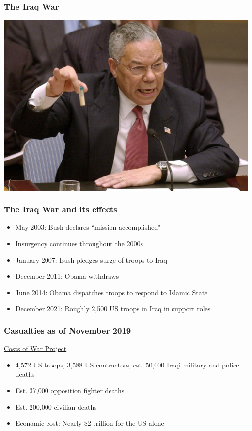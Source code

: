 \documentclass{beamer}
\begin{document}
\begin{frame} 
	\frametitle{\LARGE{The Iraq War}}
	\centering
	\includegraphics[width=\textwidth,height=0.8\textheight,keepaspectratio]{Powell.jpg}
\end{frame}


\begin{frame} 
	\frametitle{\LARGE{The Iraq War and its effects}}
	\begin{itemize}
		\item May 2003: Bush declares ``mission accomplished"
		\item Insurgency continues throughout the 2000s
		\item January 2007: Bush pledges surge of troops to Iraq
		\item December 2011: Obama withdraws
		\item June 2014: Obama dispatches troops to respond to Islamic State 
		\item December 2021: Roughly 2,500 US troops in Iraq in support roles
	\end{itemize}
\end{frame}

\begin{frame} 
	\frametitle{\LARGE{Casualties as of November 2019}}
	\href{https://watson.brown.edu/costsofwar/}{Costs of War Project}
	\begin{itemize}
		\item 4,572 US troops, 3,588 US contractors, est. 50,000 Iraqi military and police deaths
		\item Est. 37,000 opposition fighter deaths
		\item Est. 200,000 civilian deaths
		\item Economic cost: Nearly \$2 trillion for the US alone
	\end{itemize}
\end{frame}
\end{document}
